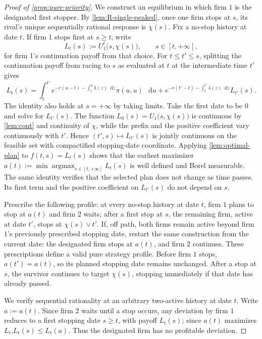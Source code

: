 \documentclass[12pt,reqno]{article}
\newcommand{\de}{\mathop{}\!\mathrm{d}}
\theoremstyle{definition} \newtheorem{example}{Example}
\theoremstyle{definition} \newtheorem{condition}{Condition}
\theoremstyle{definition} \newtheorem{corollary}{Corollary}
\theoremstyle{definition} \newtheorem{claim}{Claim}
\theoremstyle{definition} \newtheorem{definition}{Definition}
\theoremstyle{definition} \newtheorem{conjecture}{Conjecture}
\theoremstyle{definition} \newtheorem{Lemma}{Lemma}
\theoremstyle{definition} \newtheorem{lemma}{Lemma}
\theoremstyle{plain} \newtheorem{theorem}{Theorem}
\theoremstyle{definition} \newtheorem{assumption}{Assumption}
\theoremstyle{definition} \newtheorem*{assumptionnonumber}{Assumption}
\theoremstyle{definition} \newtheorem*{theoremNoNumber}{Proposition}
\theoremstyle{definition}
\theoremstyle{definition}\newtheorem{proposition}{Proposition}
\theoremstyle{definition} \newtheorem{result}{Result}
\theoremstyle{definition} \newtheorem*{definitionNoNumber}{Definition}
\theoremstyle{definition} \newtheorem{Definition}{Definition}
\theoremstyle{definition} \newtheorem*{DefinitionNoNumber}{Definition}
\theoremstyle{definition} \newtheorem*{fact}{Fact}
\theoremstyle{definition} \newtheorem*{property}{Property}
\DeclareMathOperator*{\argmax}{argmax}
\theoremstyle{definition} \newtheorem{remark}{Remark}
\begin{document}
\begin{proof}[Proof of \cref{prop:pure-priority}]
We construct an equilibrium in which firm $1$ is the designated first
stopper. By \cref{lem:R-single-peaked}, once one firm stops at $s$, its
rival's unique sequentially rational response is $\chi(s)$. Fix a no-stop history at date $t$. If firm 1 stops first at $s\ge t$, write
\[
L_t(s):=U_1^t\big(s,\chi(s)\big),\qquad s\in[t,+\infty],
\]
for firm 1's continuation payoff from that choice. For $t\le t'\le s$, splitting the continuation payoff from racing to $s$ as evaluated at $t$ at the intermediate time $t'$ gives
\[
L_t(s)
=
\int_t^{t'}
e^{-r(u-t)-\int_t^u\lambda(z)\de z}\pi(u,u)\,\de u
+
e^{-r(t'-t)-\int_t^{t'}\lambda(z)\de z}L_{t'}(s).
\]
The identity also holds at $s=+\infty$ by taking limits. Take the first
date to be $0$ and solve for $L_{t'}(s)$. The function
$L_0(s)=U_1\big(s,\chi(s)\big)$ is continuous by \cref{lem:cont} and
continuity of $\chi$, while the prefix and the positive coefficient vary
continuously with $t'$. Hence $(t',s)\mapsto L_{t'}(s)$ is jointly
continuous on the feasible set with compactified stopping-date
coordinate. Applying
\cref{lem:optimal-plan} to
$f(t,s)=L_t(s)$ shows that the earliest maximizer
$
a(t):=\min\argmax_{s\in[t,+\infty]}L_t(s)$ 
is well defined and Borel measurable. The same identity verifies that the selected plan does not change as time passes. Its first term and the positive coefficient on
$L_{t'}(s)$ do not depend on $s$. 

Prescribe the following profile: at every no-stop history at date $t$, firm $1$ plans to stop at $a(t)$ and firm $2$ waits; after a first stop at $s$, the remaining firm, active at date $t'$, stops at $\chi(s)\vee t'$. If, off path, both firms remain active beyond firm $1$’s previously prescribed stopping date, restart the same construction from the current date: the designated firm stops at \(a(t)\), and firm $2$ continues. These prescriptions define a valid pure strategy profile. Before firm $1$  stops, \(a(t')=a(t)\), so its planned stopping date remains unchanged. After a stop at \(s\), the survivor continues to target \(\chi(s)\), stopping immediately if that date has already passed.

We verify sequential rationality at an arbitrary two-active history at date $t$. Write $a:=a(t)$. Since firm $2$ waits until a stop occurs, any deviation by firm $1$ reduces to a first stopping date $s\ge t$, with payoff $L_t(s)$; since $a(t)$ maximizes $L_t$,$
L_t(s)\le L_t(a).$
Thus the designated firm has no profitable deviation.


\end{proof}
\end{document}
